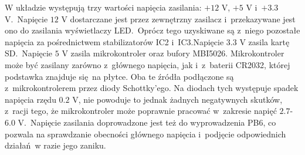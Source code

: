 W układzie występują trzy wartości napięcia zasilania: $+12$ V, $+5$ V i~$+3.3$ V.~Napięcie $12$ V dostarczane jest przez zewnętrzny zasilacz i~przekazywane jest ono do zasilania wyświetlaczy LED.~Oprócz tego uzyskiwane są z~niego pozostałe napięcia za pośrednictwem stabilizatorów IC2 i~IC3.Napięcie $3.3$ V zasila kartę SD.~Napięcie $5$ V zasila mikrokontroler oraz bufory MBI5026. Mikrokontroler może być zasilany zarówno z~głównego napięcia, jak i~z~baterii CR2032, której podstawka znajduje się na płytce. Oba te źródła podłączone są z~mikrokontrolerem przez diody Schottky'ego. Na diodach tych występuje spadek napięcia rzędu $0.2$ V, nie powoduje to jednak żadnych negatywnych skutków, z~racji tego, że mikrokontroler może poprawnie pracować w~zakresie napięć $2.7$-$6.0$ V.~Napięcie zasilania doprowadzone jest też do wyprowadzenia PB6, co pozwala na sprawdzanie obecności głównego napięcia i~podjęcie odpowiednich działań w razie jego zaniku.

